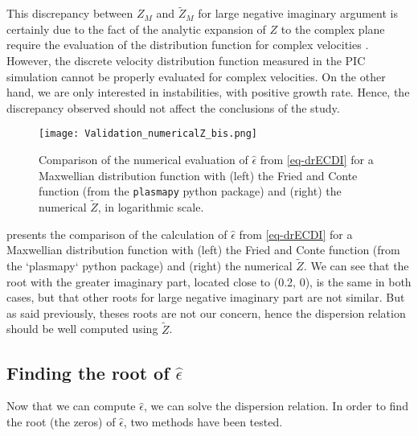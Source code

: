   This discrepancy between $Z_M$ and $\tilde{Z}_M$ for large negative imaginary argument is certainly due to the fact of the analytic expansion of $Z$ to the complex plane require the evaluation of the distribution function for complex velocities \citep{xie2013,weideman1995}.
  However, the discrete velocity distribution function measured in the \ac{PIC} simulation cannot be properly evaluated for complex velocities.
  On the other hand, we are only interested in instabilities, with positive growth rate.
  Hence, the discrepancy observed should not affect the conclusions of the study.
  


  \begin{figure}[hbt]
    \centering
    \texttt{[image: Validation\_numericalZ\_bis.png]}
    \caption{Comparison of the numerical evaluation of $\hat\epsilon$ from \cref{eq-drECDI} for a Maxwellian distribution function with (left) the Fried and Conte function (from the \texttt{plasmapy} python package) and (right) the numerical $\tilde{Z}$, in logarithmic scale.  }
    \label{fig-numZbis}
  \end{figure}
  
   presents the comparison of the calculation of $\hat\epsilon$ from \cref{eq-drECDI} for a Maxwellian distribution function with (left) the Fried and Conte function (from the `plasmapy` python package) and (right) the numerical $\tilde{Z}$.
  We can see that the root with the greater imaginary part, located close to (0.2, 0), is the same in both cases, but that other roots for large negative imaginary part are not similar.
  But as said previously, theses roots are not our concern, hence the dispersion relation should be well computed using $\tilde{Z}$.
  
  
  \subsection{Finding the root of $\hat\epsilon$}
  Now that we can compute $\hat\epsilon$, we can solve the dispersion relation.
  In order to find the root (the zeros) of $\hat\epsilon$, two methods have been tested.
  
  
